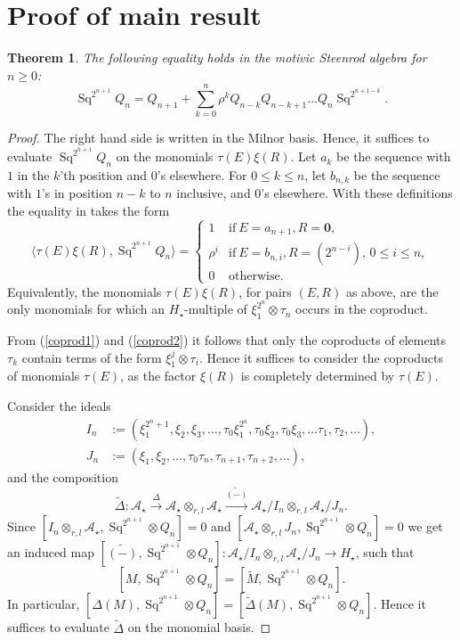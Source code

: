 \documentclass[11pt,hyp]{nyjm}
\newcommand{\A}{\mathcal{A}}
\newcommand{\tensor}{\otimes}
\newcommand{\DeltaT}{\widetilde{\Delta}}
\newcommand{\Sq}{\operatorname{Sq}}
\theoremstyle{theoremstyle}
\newtheorem{theorem}{Theorem}
\theoremstyle{definition}
\theoremstyle{theoremstyle}
\begin{document}
\section{Proof of main result}
\begin{theorem}
  \label{main}
  The following equality holds in the motivic Steenrod algebra for $n \geq 0$:
  \[
  \Sq^{2^{n+1}}Q_{n} = Q_{n+1} + \sum_{k=0}^{n} \rho^k Q_{n-k}Q_{n-k+1}\dots Q_n \Sq^{2^{n+1 - k}}.
  \]
\end{theorem}
\begin{proof}
  The right hand side is written in the Milnor basis.
  Hence, it suffices to evaluate $\Sq^{2^{n+1}}Q_n$ on the monomials $\tau(E)\xi(R)$.
  Let $a_k$ be the sequence with $1$ in the $k$'th position and $0$'s elsewhere.
  For $0 \leq k \leq n$, let $b_{n,k}$ be the sequence with $1$'s in position $n-k$ to $n$ inclusive, and $0$'s elsewhere.
  With these definitions the equality in  takes the form
  \[
  \langle \tau(E)\xi(R), \Sq^{2^{n+1}} Q_n \rangle = \begin{cases}
    1 & \text{if}\ E=a_{n+1}, R=\mathbf{0}, \\
    \rho^i & \text{if}\ E=b_{n,i}, R=(2^{n-i}),\, 0 \leq i \leq n, \\
    0 & \text{otherwise}.
    \end{cases}
  \]
  Equivalently, the monomials $\tau(E)\xi(R)$, for pairs $(E, R)$ as above,
  are the only monomials for which an $H_\star$-multiple of $\xi_1^{2^n}\tensor \tau_n$ occurs in the coproduct.

  From (\ref{coprod1}) and (\ref{coprod2}) it follows that only the coproducts of elements $\tau_k$ contain terms of the form $\xi_1^j \tensor \tau_{i}$. Hence it suffices to consider the coproducts of monomials $\tau(E)$, as the factor $\xi(R)$ is completely determined by $\tau(E)$.
  
  Consider the ideals
  \begin{align*}
    I_n &:= (\xi_1^{2^{n}+1}, \xi_2, \xi_3, \dots, \tau_0\xi^{2^n}_1, \tau_0\xi_2, \tau_0\xi_3, \dots \tau_1, \tau_2, \dots), \\
    J_n &:= (\xi_1, \xi_2, \dots, \tau_0\tau_n, \tau_{n+1}, \tau_{n+2}, \dots),
  \end{align*}
  and the composition
  \[
  \DeltaT : \A_\star \xrightarrow{\Delta} \A_\star \tensor_{r,l} \A_\star \xrightarrow{\widetilde{(-)}} \A_\star/I_n \tensor_{r,l} \A_\star/J_n.
  \]
  Since $[I_n \tensor_{r,l} \A_\star, \Sq^{2^{n+1}} \tensor Q_n ] = 0$
  and $[\A_\star \tensor_{r,l} J_n, \Sq^{2^{n+1}} \tensor Q_n] = 0$
  we get an induced map $[\widetilde{(-)}, \Sq^{2^{n+1}} \tensor Q_n] : \A_\star/I_n \tensor_{r,l} \A_\star/J_n \to H_\star$,
  such that
  \[
  [M, \Sq^{2^{n+1}} \tensor Q_n] = [\widetilde{M}, \Sq^{2^{n+1}} \tensor Q_n].
  \]
  In particular,
  $[\Delta(M), \Sq^{2^{n+1}} \tensor Q_n] = [\DeltaT(M), \Sq^{2^{n+1}} \tensor Q_n]$.
  Hence it suffices to evaluate $\DeltaT$ on the monomial basis.


\end{proof}
\end{document}
